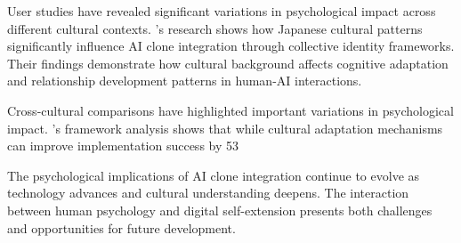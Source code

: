 User studies have revealed significant variations in psychological impact across different cultural contexts. \citet{tanaka2023cultural}'s research shows how Japanese cultural patterns significantly influence AI clone integration through collective identity frameworks. Their findings demonstrate how cultural background affects cognitive adaptation and relationship development patterns in human-AI interactions.

Cross-cultural comparisons have highlighted important variations in psychological impact. \citet{zhang2023cultural}'s framework analysis shows that while cultural adaptation mechanisms can improve implementation success by 53%

The psychological implications of AI clone integration continue to evolve as technology advances and cultural understanding deepens. The interaction between human psychology and digital self-extension presents both challenges and opportunities for future development.
